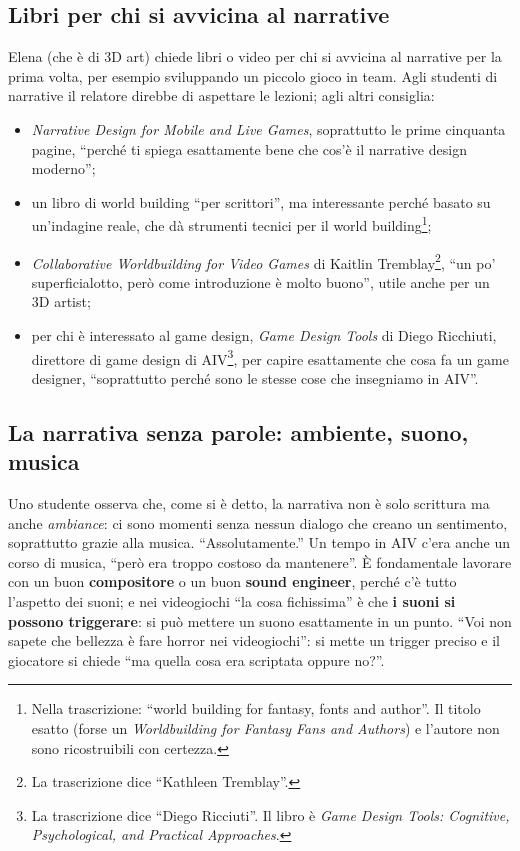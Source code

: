 \subsection{Libri per chi si avvicina al narrative}

Elena (che è di 3D art) chiede libri o video per chi si avvicina al narrative
per la prima volta, per esempio sviluppando un piccolo gioco in team. Agli
studenti di narrative il relatore direbbe di aspettare le lezioni; agli altri
consiglia:
\begin{itemize}
  \item \emph{Narrative Design for Mobile and Live Games}, soprattutto le
        prime cinquanta pagine, ``perché ti spiega esattamente bene che cos'è
        il narrative design moderno'';
  \item un libro di world building ``per scrittori'', ma interessante perché
        basato su un'indagine reale, che dà strumenti tecnici per il world
        building\footnote{Nella trascrizione: ``world building for fantasy,
        fonts and author''. Il titolo esatto (forse un \emph{Worldbuilding for
        Fantasy Fans and Authors}) e l'autore non sono ricostruibili con
        certezza.};
  \item \emph{Collaborative Worldbuilding for Video Games} di Kaitlin
        Tremblay\footnote{La trascrizione dice ``Kathleen Tremblay''.},
        ``un po' superficialotto, però come introduzione è molto buono'', utile
        anche per un 3D artist;
  \item per chi è interessato al game design, \emph{Game Design Tools} di
        Diego Ricchiuti, direttore di game design di AIV\footnote{La
        trascrizione dice ``Diego Ricciuti''. Il libro è \emph{Game Design
        Tools: Cognitive, Psychological, and Practical Approaches}.}, per
        capire esattamente che cosa fa un game designer, ``soprattutto perché
        sono le stesse cose che insegniamo in AIV''.
\end{itemize}

\subsection{La narrativa senza parole: ambiente, suono, musica}

Uno studente osserva che, come si è detto, la narrativa non è solo scrittura
ma anche \emph{ambiance}: ci sono momenti senza nessun dialogo che creano un
sentimento, soprattutto grazie alla musica. ``Assolutamente.'' Un tempo in AIV
c'era anche un corso di musica, ``però era troppo costoso da mantenere''. È
fondamentale lavorare con un buon \textbf{compositore} o un buon \textbf{sound
engineer}, perché c'è tutto l'aspetto dei suoni; e nei videogiochi ``la cosa
fichissima'' è che \textbf{i suoni si possono triggerare}: si può mettere un
suono esattamente in un punto. ``Voi non sapete che bellezza è fare horror
nei videogiochi'': si mette un trigger preciso e il giocatore si chiede ``ma
quella cosa era scriptata oppure no?''.

